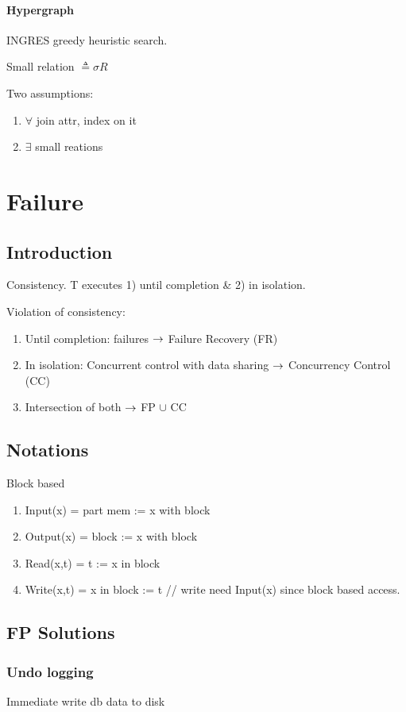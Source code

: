 \documentclass[a4paper]{report}
\begin{document}
\subsubsection{Hypergraph}
INGRES greedy heuristic search. 

Small relation $\triangleq \sigma R$  

Two assumptions:
\begin{enumerate}
\item $\forall$ join attr, index on it
\item $\exists$  small reations
\end{enumerate}

\chapter{Failure}
\section*{Introduction}
Consistency. T executes 1) until completion \& 2) in isolation. 

Violation of consistency: 
\begin{enumerate}
\item Until completion: failures $\rightarrow$ Failure Recovery (FR)
\item In isolation: Concurrent control with data sharing $\rightarrow$ Concurrency Control
(CC)
\item Intersection of both $\rightarrow$ FP $\cup$ CC
\end{enumerate}

\section{Notations}
Block based 
\begin{enumerate}
\item Input(x) = part mem := x with block 
\item Output(x) = block := x with block
\item Read(x,t) = t := x in block 
\item Write(x,t) = x in block := t // write need Input(x) since block based access.
\end{enumerate}

\section{FP Solutions}
\subsection{Undo logging}
Immediate write db data to disk 
\end{document}
